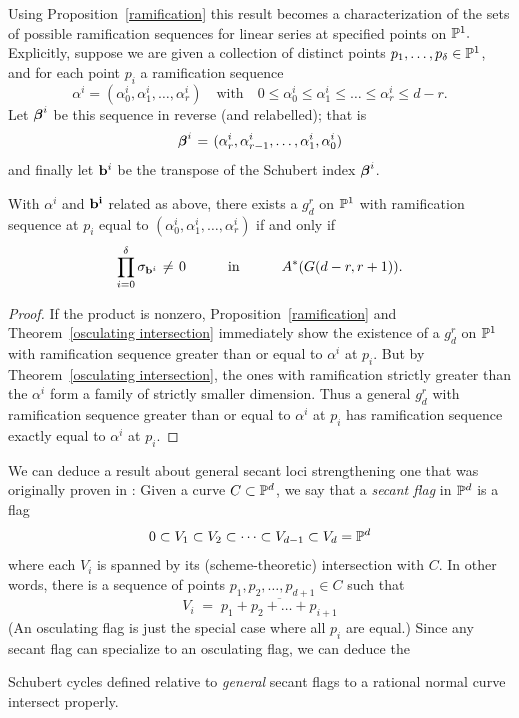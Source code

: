 Using Proposition~\ref{ramification} this result becomes a characterization of the sets of possible ramification
sequences for linear series at specified points on $\mathbb P^1.$
 Explicitly, suppose we are given a collection of distinct points $p_1,\dots,p_\delta \in \mathbb P^1$, and for each point $p_i$ a ramification sequence
$$
\alpha^i = (\alpha^i_0, \alpha^i_1, \dots, \alpha^i_r) \quad \text{with} \quad 0 \leq \alpha^i_0 \leq \alpha^i_1 \leq \dots \leq \alpha^i_r \leq d-r.
$$
Let ${{\boldsymbol{\beta}}}^i$ be this sequence in reverse (and relabelled); that is
$$
{\bbeta}^i \; = \; (\alpha^i_r, \alpha^i_{r-1}, \dots, \alpha^i_1, \alpha^i_0)
$$
and finally let ${\bf b}^i$ be the transpose of the Schubert index ${{\boldsymbol{\beta}}}^i$. 

\begin{corollary}
With $\alpha^i $ and $\bf b^i$ related as above,  there exists a $g^r_d$ on $\mathbb P^1$ with ramification sequence at $p_i$ equal to $(\alpha^i_0, \alpha^i_1, \dots, \alpha^i_r)$ if and only if 
$$
\prod_{i=0}^\delta  \sigma_{{\bf b}^i} \; \neq \; 0 \quad \text{in} \quad A^*(G(d-r, r+1)).
$$
\end{corollary}

\begin{proof}
If the product is nonzero, Proposition~\ref{ramification} and Theorem~\ref{osculating intersection} immediately show the existence of a $g^r_d$ on $\mathbb P^1$ with ramification sequence greater than or equal to $\alpha^i$ at $p_i$. But by Theorem~\ref{osculating intersection}, the ones with ramification strictly greater than the $\alpha^i$ form a family of strictly smaller dimension. Thus a general $g^r_d$ with ramification sequence greater than or equal to $\alpha^i$ at $p_i$ has  ramification sequence exactly equal to $\alpha^i$ at $p_i$.
\end{proof}

We can deduce a result about general secant loci strengthening one that was originally proven in \cite{Griffiths-Harris-BN}:
Given a curve $C \subset \mathbb P^d$, we say that a \emph{secant flag} in $\mathbb P^d$ is a flag
$$
0 \subset V_1 \subset V_2 \subset \dots \subset V_{d-1} \subset V_d = \mathbb P^d
$$
where each $V_i$ is spanned by its (scheme-theoretic) intersection with $C$. In other words, there is a sequence of points $p_1, p_2, \dots, p_{d+1} \in C$ such that
$$
V_i \; = \; \overline{p_1+p_2+ \dots + p_{i+1}}
$$
(An osculating flag is just the special case where all $p_i$ are equal.) Since any secant flag can specialize to an osculating flag, we can deduce the

\begin{corollary}\label{secant schubert proper}
Schubert cycles defined relative to \emph{general} secant flags to a rational normal curve intersect properly.
\end{corollary} 

